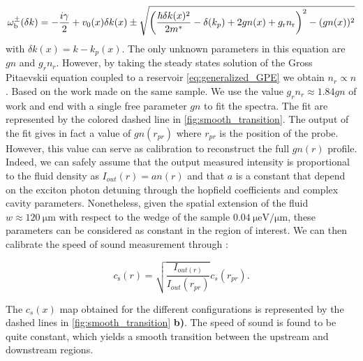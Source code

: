 \begin{equation}
    \label{eq:lfbogo}
    \omega_{\mathrm{b}}^{\pm}(\delta k)= -\frac{i\gamma}{2}+ v_0(x) \delta k(x)\pm\sqrt{\left(\frac{\hbar \delta k(x)^2}{2m^*}-\delta(k_p) +2gn(x) +g_\mathrm{r} n_\mathrm{r}    \right)^2-(gn(x))^2}
\end{equation}
with $\delta k(x)=k-k_p(x)$. The only unknown parameters in this equation are $gn$ and $g_rn_r$. However, by taking the steady states solution of the Gross Pitaevskii equation coupled to a reservoir \autoref{eq:generalized_GPE} we obtain $n_r\propto n$.
Based on the work \cite{claude_phd,claude_high-resolution_2022} made on the same sample. We use the value $g_rn_r\approx 1.84gn$ of work \cite{claude_phd} and end 
with a single free parameter $gn$ to fit the spectra. The fit are represented by the colored dashed line in \autoref{fig:smooth_transition}. The output of the fit gives in fact a value of $gn(r_{pr})$ where $r_{pr}$ is the position of the probe. However, this value can serve 
as calibration to reconstruct the full $gn(r)$ profile. Indeed, we can safely assume that the output measured intensity is proportional to the 
fluid density as $I_{out}(r)=a n(r)$ and that $a$ is a constant that depend on the exciton photon detuning through the hopfield coefficients and complex 
cavity parameters. Nonetheless, given the spatial extension of the fluid $w\approx \SI{120}{\micro \meter}$ with respect to the wedge of the sample $\SI{0.04}{\micro \electronvolt \per \micro \meter}$, these parameters can be considered as constant in the region of interest.
We can then calibrate the speed of sound measurement through :

\begin{equation}
    \label{eq:speed_of_sound_calib}
    c_\mathrm{s}(r)=\sqrt{\frac{I_{out(r)}}{I_{out}(r_{pr})}}c_s(r_{pr}).
\end{equation}

The $c_s(x)$ map obtained for the different configurations is represented by the dashed lines in \autoref{fig:smooth_transition} \textbf{b)}. The speed of sound is found to be quite constant, which yields a smooth transition between the upstream and downstream regions. 

